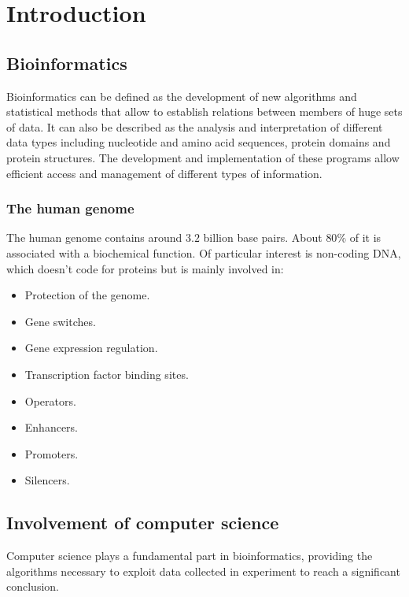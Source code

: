 \graphicspath{{chapters/01/images}}
\chapter{Introduction}

\section{Bioinformatics}
Bioinformatics can be defined as the development of new algorithms and statistical methods that allow to establish relations between members of huge sets of data.
It can also be described as the analysis and interpretation of different data types including nucleotide and amino acid sequences, protein domains and protein structures.
The development and implementation of these programs allow efficient access and management of different types of information.

	\subsection{The human genome}
	The human genome contains around $3.2$ billion base pairs.
	About $80\%$ of it is associated with a biochemical function.
	Of particular interest is non-coding DNA, which doesn't code for proteins but is mainly involved in:

	\begin{multicols}{3}
		\begin{itemize}
			\item Protection of the genome.
			\item Gene switches.
			\item Gene expression regulation.
			\item Transcription factor binding sites.
			\item Operators.
			\item Enhancers.
			\item Promoters.
			\item Silencers.
		\end{itemize}
	\end{multicols}

\section{Involvement of computer science}
Computer science plays a fundamental part in bioinformatics, providing the algorithms necessary to exploit data collected in experiment to reach a significant conclusion.

